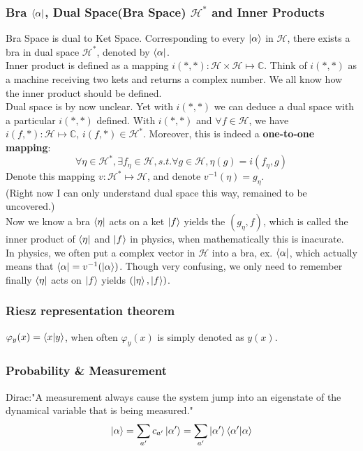 \documentclass[a4paper, 11pt]{article}
\begin{document}
\subsubsection{Bra $\bra{\alpha}$, Dual Space(Bra Space) $\mathcal{H}^*$ and Inner Products}
Bra Space is dual to Ket Space. Corresponding to every $\ket{\alpha}$ in $\mathcal{H}$, there exists a bra in dual space $\mathcal{H}^*$, denoted by $\bra{\alpha}$.\\
\indent Inner product is defined as a mapping $i(*, *): \mathcal{H}\times\mathcal{H} \mapsto \mathbb{C}$. Think of $i(*, *)$ as a machine receiving two kets and returns a complex number. We all know how the inner product should be defined.\\
\indent Dual space is by now unclear. Yet with $i(*, *)$ we can deduce a dual space with a particular $i(*, *)$ defined. With $i(*, *)$ and $\forall f \in \mathcal{H}$, we have $i(f, *): \mathcal{H} \mapsto \mathbb{C}$, $i(f, *) \in \mathcal{H}^*$. Moreover, this is indeed a \textbf{one-to-one mapping}:
\begin{equation}
\forall \eta \in \mathcal{H}^*, \exists f_{\eta} \in \mathcal{H}, s.t. \forall g \in \mathcal{H}, \eta(g) = i(f_{\eta}, g)
\end{equation}
\indent Denote this mapping $v: \mathcal{H}^* \mapsto \mathcal{H}$, and denote $v^{-1}(\eta) = g_{\eta}$. \\
(Right now I can only understand dual space this way, remained to be uncovered.)\\
\indent Now we know a bra $\bra{\eta}$ acts on a ket $\ket{f}$ yields the $(g_{\eta}, f)$, which is called the inner product of $\bra{\eta}$ and $\ket{f}$ in physics, when mathematically this is inacurate.\\
\indent In physics, we often put a complex vector in $\mathcal{H}$ into a bra, ex. $\bra{\alpha}$, which actually means that $\bra{\alpha} = v^{-1}(\ket{\alpha})$. Though very confusing, we only need to remember finally $\bra{\eta}$ acts on $\ket{f}$ yields $(\ket{\eta}, \ket{f})$.
\subsubsection{Riesz representation theorem}
$\varphi_y(x) = \braket{x|y}$, when often $\varphi_y(x)$ is simply denoted as $y(x)$.

\subsubsection{Probability \& Measurement}
Dirac:"A measurement always cause the system jump into an eigenstate of the dynamical variable that is being measured."\\
\begin{equation}
 \ket{\alpha} = \sum_{a'}c_{a'}\ket{\alpha'} = \sum_{a'}\ket{\alpha'}\braket{\alpha'|\alpha}
\end{equation}
\end{document}
